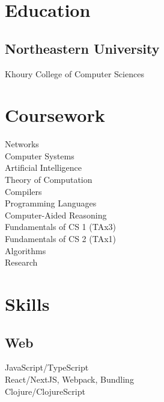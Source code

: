 \documentclass[letterpaper]{cv} %
\begin{document}
\begin{minipage}[t]{0.33\textwidth} %

  \section{Education}
  \subsection{Northeastern University}
  Khoury College of Computer Sciences \\
  \sectionspace %

  \section{Coursework}
  Networks \\
  Computer Systems \\
  Artificial Intelligence \\
  Theory of Computation \\
  Compilers \\
  Programming Languages \\
  Computer-Aided Reasoning \\
  Fundamentals of CS 1 (TAx3) \\
  Fundamentals of CS 2 (TAx1) \\
  Algorithms \\
  Research

  \sectionspace


  \section{Skills}
  \subsection{Web}
  \textbullet{} JavaScript/TypeScript \\
  \textbullet{} React/NextJS, Webpack, Bundling \\
  \textbullet{} Clojure/ClojureScript \\
  \sectionspace

\end{minipage}
\end{document}
